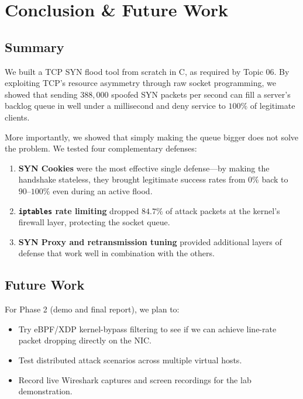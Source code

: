\documentclass[11pt,a4paper]{report}
\begin{document}
\chapter{Conclusion \& Future Work}

\section{Summary}
We built a TCP SYN flood tool from scratch in C, as required by Topic 06. By exploiting TCP's resource asymmetry through raw socket programming, we showed that sending $388{,}000$ spoofed SYN packets per second can fill a server's backlog queue in well under a millisecond and deny service to $100\%$ of legitimate clients.

More importantly, we showed that simply making the queue bigger does not solve the problem. We tested four complementary defenses:
\begin{enumerate}
    \item \textbf{SYN Cookies} were the most effective single defense---by making the handshake stateless, they brought legitimate success rates from $0\%$ back to $90\text{--}100\%$ even during an active flood.
    \item \textbf{\texttt{iptables} rate limiting} dropped $84.7\%$ of attack packets at the kernel's firewall layer, protecting the socket queue.
    \item \textbf{SYN Proxy and retransmission tuning} provided additional layers of defense that work well in combination with the others.
\end{enumerate}

\section{Future Work}
For Phase 2 (demo and final report), we plan to:
\begin{itemize}
    \item Try eBPF/XDP kernel-bypass filtering to see if we can achieve line-rate packet dropping directly on the NIC.
    \item Test distributed attack scenarios across multiple virtual hosts.
    \item Record live Wireshark captures and screen recordings for the lab demonstration.
\end{itemize}
\end{document}
